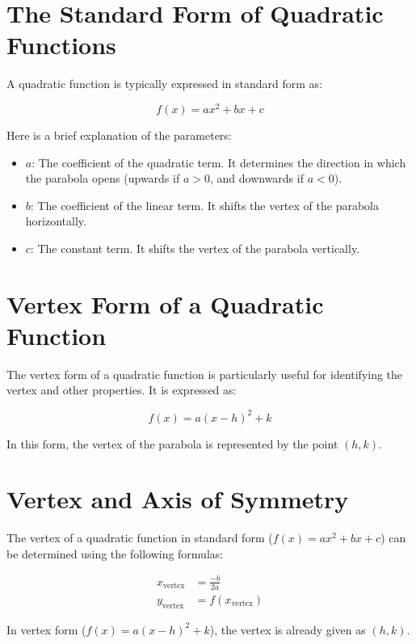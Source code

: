 \documentclass[12pt,a4paper]{article}
\begin{document}
\section{The Standard Form of Quadratic Functions}

A quadratic function is typically expressed in standard form as:

\begin{equation}
f(x) = ax^2 + bx + c
\end{equation}

Here is a brief explanation of the parameters:

\begin{itemize}
    \item $a$: The coefficient of the quadratic term. It determines the direction in which the parabola opens (upwards if $a > 0$, and downwards if $a < 0$).
    \item $b$: The coefficient of the linear term. It shifts the vertex of the parabola horizontally.
    \item $c$: The constant term. It shifts the vertex of the parabola vertically.
\end{itemize}

\section{Vertex Form of a Quadratic Function}

The vertex form of a quadratic function is particularly useful for identifying the vertex and other properties. It is expressed as:

\begin{equation}
f(x) = a(x - h)^2 + k
\end{equation}

In this form, the vertex of the parabola is represented by the point $(h, k)$.
\newpage
\section{Vertex and Axis of Symmetry}

The vertex of a quadratic function in standard form ($f(x) = ax^2 + bx + c$) can be determined using the following formulas:

\begin{align}
x_{\text{vertex}} &= \frac{-b}{2a} \\
y_{\text{vertex}} &= f(x_{\text{vertex}})
\end{align}

In vertex form ($f(x) = a(x - h)^2 + k$), the vertex is already given as $(h, k)$.
\end{document}
